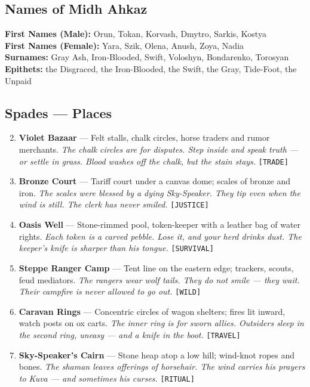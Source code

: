 {{\subsection*{Names of Midh Ahkaz}

\textbf{First Names (Male):} Orun, Tokan, Korvash, Dmytro, Sarkis, Kostya \\
\textbf{First Names (Female):} Yara, Szik, Olena, Anush, Zoya, Nadia \\
\textbf{Surnames:} Gray Ash, Iron-Blooded, Swift, Voloshyn, Bondarenko, Torosyan \\
\textbf{Epithets:} the Disgraced, the Iron-Blooded, the Swift, the Gray, Tide-Foot, the Unpaid

\subsection*{Spades --- Places}
\label{sec:midh-ahkaz-places}
\begin{enumerate}
\setcounter{enumi}{1}
\item {} \textbf{Violet Bazaar} --- Felt stalls, chalk circles, horse traders and rumor merchants. \hfill \textit{The chalk circles are for disputes. Step inside and speak truth --- or settle in grass. Blood washes off the chalk, but the stain stays.} \texttt{[TRADE]}
\item {} \textbf{Bronze Court} --- Tariff court under a canvas dome; scales of bronze and iron. \hfill \textit{The scales were blessed by a dying Sky-Speaker. They tip even when the wind is still. The clerk has never smiled.} \texttt{[JUSTICE]}
\item {} \textbf{Oasis Well} --- Stone-rimmed pool, token-keeper with a leather bag of water rights. \hfill \textit{Each token is a carved pebble. Lose it, and your herd drinks dust. The keeper's knife is sharper than his tongue.} \texttt{[SURVIVAL]}
\item {} \textbf{Steppe Ranger Camp} --- Tent line on the eastern edge; trackers, scouts, feud mediators. \hfill \textit{The rangers wear wolf tails. They do not smile --- they wait. Their campfire is never allowed to go out.} \texttt{[WILD]}
\item {} \textbf{Caravan Rings} --- Concentric circles of wagon shelters; fires lit inward, watch posts on ox carts. \hfill \textit{The inner ring is for sworn allies. Outsiders sleep in the second ring, uneasy --- and a knife in the boot.} \texttt{[TRAVEL]}
\item {} \textbf{Sky-Speaker's Cairn} --- Stone heap atop a low hill; wind-knot ropes and bones. \hfill \textit{The shaman leaves offerings of horsehair. The wind carries his prayers to Kuva --- and sometimes his curses.} \texttt{[RITUAL]}

\end{enumerate}}}
